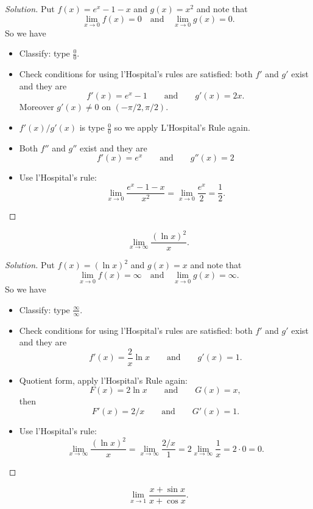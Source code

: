 \begin{proof}[Solution]
Put $f(x)=e^x-1-x$ and $g(x)=x^2$ and note that
\[
\lim_{x\to 0}f(x)=0
\quad\text{and}\quad
\lim_{x\to 0}g(x)=0.\]
So we have
\begin{itemize}[noitemsep]
\item Classify: type $\frac{0}{0}$.
\item Check conditions for using l'Hospital's rules are
  satisfied: both $f'$ and $g'$ exist and they are
  \[
    f'(x)=e^x-1\qquad\text{and}\qquad g'(x)=2x.
  \]
Moreover $g'(x)\neq 0$ on $(-\pi/2,\pi/2)$.
\item $f'(x)/g'(x)$ is type $\frac{0}{0}$ so we apply
  L'Hospital's Rule again.
\item Both $f''$ and $g''$ exist and they are
  \[
    f'(x)=e^x\qquad\text{and}\qquad g''(x)=2
  \]
\item Use l'Hospital's rule:
\[
\lim_{x\to 0}\frac{e^x-1-x}{x^2}=\lim_{x\to 0}\frac{e^x}{2}=\frac{1}{2}.
\]
\end{itemize}
\end{proof}
\begin{exercise*}[\S4.4, \#30]
\[
\lim_{x\to\infty}\frac{(\ln x)^2}{x}.
\]
\end{exercise*}
\begin{proof}[Solution]
Put $f(x)=(\ln x)^2$ and $g(x)=x$ and note that
\[
\lim_{x\to 0}f(x)=\infty
\quad\text{and}\quad
\lim_{x\to 0}g(x)=\infty.\]
So we have
\begin{itemize}[noitemsep]
\item Classify: type $\frac{\infty}{\infty}$.
\item Check conditions for using l'Hospital's rules are
  satisfied: both $f'$ and $g'$ exist and they are
  \[
    f'(x)=\frac{2}{x}\ln x\qquad\text{and}\qquad g'(x)=1.
  \]
\item Quotient form, apply l'Hospital's Rule again:
\[
 F(x)=2\ln x\qquad\text{and}\qquad G(x)=x,
\]
then
\[
 F'(x)=2/x\qquad\text{and}\qquad G'(x)=1.
\]
\item Use l'Hospital's rule:
\[
\lim_{x\to\infty}\frac{(\ln
  x)^2}{x}=\lim_{x\to\infty}\frac{2/x}{1}=2\lim_{x\to\infty}\frac{1}{x}=2\cdot
0=0.
\]
\end{itemize}
\end{proof}
\begin{exercise*}[\S4.4, \#33]
\[
\lim_{x\to 1}\frac{x+\sin x}{x+\cos x}.
\]
\end{exercise*}
